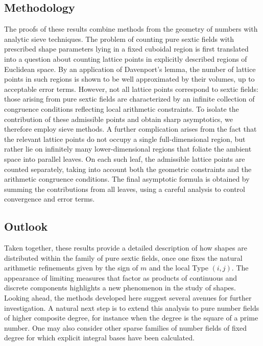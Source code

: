\documentclass[table]{amsart}
\numberwithin{equation}{section}
\begin{document}
\subsection{Methodology} The proofs of these results combine methods from the geometry of numbers with analytic sieve techniques. The problem of counting pure sextic fields with prescribed shape parameters lying in a fixed cuboidal region is first translated into a question about counting lattice points in explicitly described regions of Euclidean space. By an application of Davenport’s lemma, the number of lattice points in such regions is shown to be well approximated by their volumes, up to acceptable error terms. However, not all lattice points correspond to sextic fields: those arising from pure sextic fields are characterized by an infinite collection of congruence conditions reflecting local arithmetic constraints. To isolate the contribution of these admissible points and obtain sharp asymptotics, we therefore employ sieve methods. A further complication arises from the fact that the relevant lattice points do not occupy a single full-dimensional region, but rather lie on infinitely many lower-dimensional regions that foliate the ambient space into parallel leaves. On each such leaf, the admissible lattice points are counted separately, taking into account both the geometric constraints and the arithmetic congruence conditions. The final asymptotic formula is obtained by summing the contributions from all leaves, using a careful analysis to control convergence and error terms.
\subsection{Outlook}
Taken together, these results provide a detailed description of how shapes are distributed within the family of pure sextic fields, once one fixes the natural arithmetic refinements given by the sign of \(m\) and the local Type \((i,j)\). The appearance of limiting measures that factor as products of continuous and discrete components highlights a new phenomenon in the study of shapes. Looking ahead, the methods developed here suggest several avenues for further investigation. A natural next step is to extend this analysis to pure number fields of higher composite degree, for instance when the degree is the square of a prime number. One may also consider other sparse families of number fields of fixed degree for which explicit integral bases have been calculated. 
\end{document}
